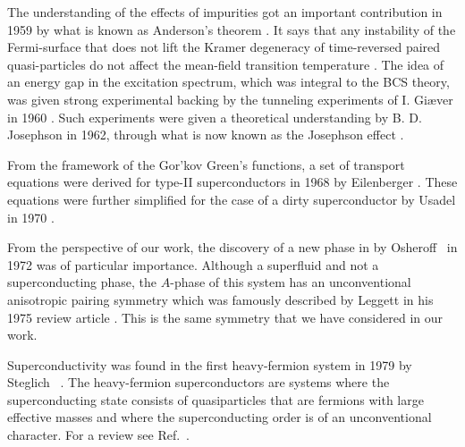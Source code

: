 The understanding of the effects of impurities got an important contribution in 1959 by what is known as Anderson's theorem \cite{Anderson59}.
It says that any instability of the Fermi-surface that does not lift the Kramer degeneracy of time-reversed paired quasi-particles do not affect
the mean-field transition temperature \cite{Balatsky06}.
The idea of an energy gap in the excitation spectrum, which was integral to the BCS theory, was given strong experimental backing by the tunneling
experiments of I. Giæver in 1960 \cite{Giaever60}.
Such experiments were given a theoretical understanding by B. D. Josephson in 1962, through what is now known as the Josephson effect
\cite{Josephson62}.

From the framework of the Gor'kov Green's functions, a set of transport equations were derived for type-II superconductors in 1968 by
Eilenberger \cite{Eilenberger68}. These equations were further simplified for the case of a dirty superconductor by Usadel in 1970 \cite{Usadel70}.

From the perspective of our work, the discovery of a new phase in  by Osheroff \etal\ in 1972 was of particular importance. Although a superfluid
and not a superconducting phase, the $A$-phase of this system has an unconventional anisotropic pairing symmetry which was famously described by Leggett in his
1975 review article \cite{Leggett75}. This is the same symmetry that we have considered in our work.

Superconductivity was found in the first heavy-fermion system  in 1979 by Steglich \etal\ \cite{Steglich79}. The heavy-fermion superconductors are systems where the superconducting
state consists of quasiparticles that are fermions with large effective masses and where the superconducting order is of an
unconventional character. For a review see Ref.~\cite{White15}.

